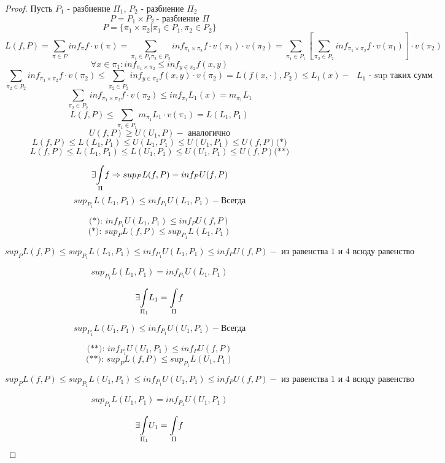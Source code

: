     \begin{proof}
        \par Пусть $P_1$ - разбиение $\Pi_1$, $P_2$ - разбиение $\Pi_2$
        $$P = P_1 \times P_2 \ \text{- разбиение } \Pi$$ 
        $$P = \{\pi_1 \times \pi_2 | \pi_1 \in P_1, \pi_2 \in P_2\}$$
        $$L(f, P) = \sum\limits_{\pi \in P} inf_{\pi} f \cdot v(\pi) = \sum\limits_{\pi_1 \in P_1 \pi_2 \in P_2} inf_{\pi_1 \times \pi_2} f \cdot v(\pi_1) \cdot v(\pi_2) = \sum\limits_{\pi_1 \in P_1} \left[ \sum\limits_{\pi_2 \in P_2} inf_{\pi_1 \times \pi_2} f \cdot v(\pi_1) \right] \cdot v(\pi_2)$$
        $$\forall x\in \pi_1: inf_{\pi_1 \times \pi_2} \le inf_{y \in \pi_2} f(x, y)$$
        $$\sum\limits_{\pi_2 \in P_2} inf_{\pi_1 \times \pi_2} f \cdot v(\pi_2) \le \sum\limits_{\pi_2 \in P_2} inf_{y \in \pi_2} f(x,y) \cdot v(\pi_2) = L(f(x, \cdot), P_2) \le L_1 (x) - \text{ $L_1$ - sup таких сумм} $$
        $$\sum\limits_{\pi_2 \in P_2} inf_{\pi_1 \times \pi_2} f \cdot v(\pi_2) \le inf_{\pi_1} L_1(x) = m_{\pi_1} L_1$$
        $$L(f, P) \le \sum\limits_{\pi_1 \in P_1} m_{\pi_1} L_1 \cdot v(\pi_1) = L(L_1, P_1)$$
        $$U(f, P) \ge U(U_1, P) - \text{ аналогично}$$
        $$L(f, P) \le L(L_1, P_1) \le U(L_1, P_1) \le U(U_1, P_1) \le U(f, P) \text{(*)} $$
        $$L(f, P) \le L(L_1, P_1) \le L(U_1, P_1) \le U(U_1, P_1) \le U(f, P) \text{(**)}$$

        $$\exists \underset{\Pi}{\int} f \Rightarrow sup_{P} L(f, P) = inf_{P} U(f, P)$$
        $$sup_{P_1} L(L_1, P_1) \le inf_{P_1} U(L_1, P_1) - \text{Всегда}$$
        
        $$\text{(*): } inf_{P_1} U(L_1, P_1) \le inf_{P} U(f, P)$$
        $$\text{(*): } sup_{P} L(f, P) \le sup_{P_1} L(L_1, P_1)$$

        $$sup_{P} L(f, P) \le sup_{P_1} L(L_1, P_1) \le inf_{P_1} U(L_1, P_1) \le inf_{P} U(f, P) - \text{ из равенства 1 и 4 всюду равенство}$$

        $$sup_{P_1} L(L_1, P_1) = inf_{P_1} U(L_1, P_1)$$

        $$\exists \underset{\Pi_1}{\int} L_1 = \underset{\Pi}{\int} f$$

        $$sup_{P_1} L(U_1, P_1) \le inf_{P_1} U(U_1, P_1) - \text{Всегда}$$
        
        $$\text{(**): } inf_{P_1} U(U_1, P_1) \le inf_{P} U(f, P)$$
        $$\text{(**): } sup_{P} L(f, P) \le sup_{P_1} L(U_1, P_1)$$

        $$sup_{P} L(f, P) \le sup_{P_1} L(U_1, P_1) \le inf_{P_1} U(U_1, P_1) \le inf_{P} U(f, P) - \text{ из равенства 1 и 4 всюду равенство}$$

        $$sup_{P_1} L(U_1, P_1) = inf_{P_1} U(U_1, P_1)$$

        $$\exists \underset{\Pi_1}{\int} U_1 = \underset{\Pi}{\int} f$$



    \end{proof}

